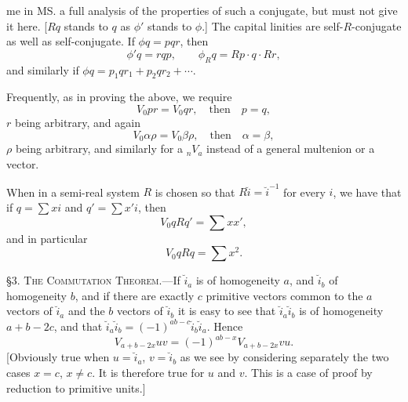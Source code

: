 \documentclass[11pt]{article}
\begin{document}
me in MS. a full analysis of the properties of such a conjugate, but must not give it here. [$R q$ stands to $q$ as $\phi'$ stands to $\phi$.] The capital linities are self-$R$-conjugate as well as self-conjugate. If $\phi q=pqr$, then
\begin{equation}\phi'q=rqp,\qquad \phi_Rq=Rp\cdot q\cdot Rr,\tag{15}\end{equation}
and similarly if $\phi q=p_1qr_1+p_2qr_2+\cdots$.

\indent Frequently, as in proving the above, we require
\begin{equation}V_0pr=V_0qr,\quad\text{then}\quad p=q,\tag{16}\end{equation}
$r$ being arbitrary, and again
\begin{equation}V_0\alpha\rho=V_0\beta\rho,\quad\text{then}\quad\alpha=\beta,\tag{17}\end{equation}
$\rho$ being arbitrary, and similarly for a ${}_nV_a$ instead of a general multenion or a vector.

\indent When in a semi-real system $R$ is chosen so that $R\breve{i}=\breve{i}^{-1}$ for every $i$, we have that if $q=\sum xi$ and $q'=\sum x'i$, then
\[V_0qRq'=\sum xx',\]
and in particular
\[V_0qRq=\sum x^2.\]

\noindent\textsc{\S 3. The Commutation Theorem.}---If $\breve{i}_a$ is of homogeneity $a$, and $\breve{i}_b$ of homogeneity $b$, and if there are exactly $c$ primitive vectors common to the $a$ vectors of $\breve{i}_a$ and the $b$ vectors of $\breve{i}_b$ it is easy to see that $\breve{i}_a\breve{i}_b$ is of homogeneity $a+b-2c$, and that $\breve{i}_a\breve{i}_b=(-1)^{ab-c}\breve{i}_b\breve{i}_a$. Hence
\begin{equation}V_{a+b-2x}uv=(-1)^{ab-x}V_{a+b-2x}vu.\tag{1}\end{equation}
[Obviously true when $u=\breve{i}_a$, $v=\breve{i}_b$ as we see by considering separately the two cases $x=c$, $x\ne c$. It is therefore true for $u$ and $v$. This is a case of proof by reduction to primitive units.]
\end{document}
